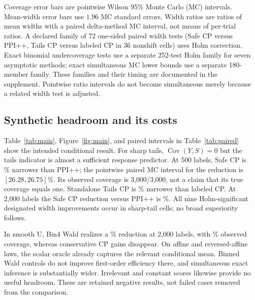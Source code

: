\documentclass{article}
\newcommand{\Cov}{\operatorname{Cov}}
\begin{document}
Coverage error bars are pointwise Wilson 95\% Monte Carlo (MC) intervals. Mean-width error bars use $1.96$ MC standard errors. Width ratios are ratios of mean widths with a paired delta-method MC interval, not means of per-trial ratios. A declared family of 72 one-sided paired width tests (Safe CP versus PPI++, Tails CP versus labeled CP in 36 nonshift cells) uses Holm correction. Exact binomial undercoverage tests use a separate 252-test Holm family for seven asymptotic methods; exact simultaneous MC lower bounds use a separate 180-member family. These families and their timing are documented in the supplement. Pointwise ratio intervals do not become simultaneous merely because a related width test is adjusted.

\subsection{Synthetic headroom and its costs}
\begin{table}[t]
\centering\small
\caption{Main synthetic results at $n=500,N=10{,}000$. Each entry is mean width / coverage in percent (3,000 repetitions). These are not equal-validity width rankings: CP procedures have finite-sample guarantees under assumptions; Wald procedures are asymptotic. Complete MC uncertainty is in Appendix~\ref{app:allresults}.}\label{tab:main}

\end{table}

Table~\ref{tab:main}, Figure~\ref{fig:main}, and paired intervals in Table~\ref{tab:paired} show the intended conditional result. For sharp tails, $\Cov(Y,S)=0$ but the tails indicator is almost a sufficient response predictor. At 500 labels, Safe CP is \SharpSafeGainPP{}\% narrower than PPI++; the pointwise paired MC interval for the reduction is $[26.28,26.75]\%$. Its observed coverage is 3,000/3,000, not a claim that its true coverage equals one. Standalone Tails CP is \SharpCPGainLabel{}\% narrower than labeled CP. At 2,000 labels the Safe CP reduction versus PPI++ is \SharpLargeGainPP{}\%. All nine Holm-significant designated width improvements occur in sharp-tail cells; no broad superiority follows.

In smooth U, Bin4 Wald realizes a \SmoothFourGainPP{}\% reduction at 2,000 labels, with \SmoothFourCov{}\% observed coverage, whereas conservative CP gains disappear. On affine and reversed-affine laws, the scalar oracle already captures the relevant conditional mean. Binned Wald controls do not improve first-order efficiency there, and simultaneous exact inference is substantially wider. Irrelevant and constant scores likewise provide no useful headroom. These are retained negative results, not failed cases removed from the comparison.
\end{document}

